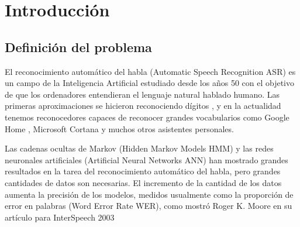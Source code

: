 \chapter{Introducción}

\section{Definición del problema}

El reconocimiento automático del habla (Automatic Speech Recognition ASR) es un campo de la Inteligencia Artificial estudiado desde los años 50 con el objetivo de que los ordenadores entendieran el lenguaje natural hablado humano. Las primeras aproximaciones se hicieron reconociendo dígitos \cite{Davis1952AutomaticDigits}, y en la actualidad tenemos reconocedores capaces de reconocer grandes vocabularios como Google Home \cite{Li2017}, Microsoft Cortana \cite{Xiong2017} y muchos otros asistentes personales.

Las cadenas ocultas de Markov (Hidden Markov Models HMM) \cite{RabinerARecognition,PaulTheRecognizer,Zue1989TheReport} y las redes neuronales artificiales (Artificial Neural Networks ANN) \cite{Waibel1989PhonemeNetworks,XuedongHuangAlexAceroHsiao-WuenHon201,Hwang} han mostrado grandes resultados en la tarea del reconocimiento automático del habla, pero grandes cantidades de datos son necesarias. El incremento de la cantidad de los datos aumenta la precisión de los modelos, medidos usualmente como la proporción de error en palabras (Word Error Rate WER), como mostró Roger K. Moore en su artículo para InterSpeech 2003 

